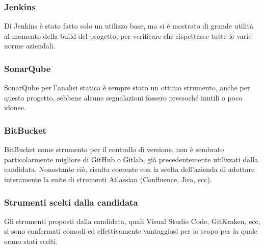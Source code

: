     \subsubsection{Jenkins}
    Di Jenkins è stato fatto solo un utilizzo base, ma si è mostrato di grande utilità al momento della build del progetto, per verificare che rispettasse tutte le varie norme aziendali.

    \subsubsection{SonarQube}
    SonarQube per l'analisi statica è sempre stato un ottimo strumento, anche per questo progetto, sebbene alcune segnalazioni fossero pressoché inutili o poco idonee.

    \subsubsection{BitBucket}
    BitBucket come strumento per il controllo di versione, non è sembrato particolarmente migliore di GitHub o Gitlab, già precedentemente utilizzati dalla candidata.
    Nonostante ciò, risulta coerente con la scelta dell'azienda di adottare interamente la suite di strumenti Atlassian (Confluence, Jira, ecc).

    \subsubsection{Strumenti scelti dalla candidata}
    Gli strumenti proposti dalla candidata, quali Visual Studio Code, GitKraken, ecc, si sono confermati comodi ed effettivamente vantaggiosi per lo scopo per la quale erano stati scelti.




\clearpage

